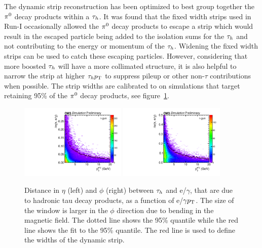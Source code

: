 The dynamic strip reconstruction has been optimized to best group together the $\pi^{0}$ 
decay products within a $\tau_{h}$. It was found that the fixed width strips used in Run-I
occasionally allowed the $\pi^{0}$ decay products to escape a strip which would result in
the escaped particle being added to the isolation sums for the $\tau_{h}$ and not contributing
to the energy or momentum of the $\tau_{h}$. Widening the fixed width strips can be used to catch
these escaping particles. However, considering that more boosted $\tau_{h}$ will have a more 
collimated structure, it is also helpful to narrow the strip at higher $\tau_{h} p_\mathrm{T}$ to suppress
pileup or other non-$\tau$ contributions when possible. The strip widths are calibrated to
on simulations that target retaining 95\% of the $\pi^{0}$ decay products, see figure~\ref{fig:tau_dyn_strip}.

\begin{figure}[htbp]
\centering
     \includegraphics[width=0.45\textwidth]{object_reconstruction_and_selection/plots/tau_dyn_strip_eta.pdf}
     \includegraphics[width=0.45\textwidth]{object_reconstruction_and_selection/plots/tau_dyn_strip_phi.pdf}
     \caption{
Distance in $\eta$ (left) and $\phi$ (right) between $\tau_{h}$ and e/$\gamma$, that are due to 
hadronic tau decay
products, as a function of e/$\gamma p_\mathrm{T}$. The size of the window is larger in the $\phi$
direction due to bending in the magnetic field. The dotted line shows the 95\%
quantile while the red line shows the fit to the 95\% quantile. The red line is used
to define the widths of the dynamic strip.
     }
     \label{fig:tau_dyn_strip}
\end{figure}

